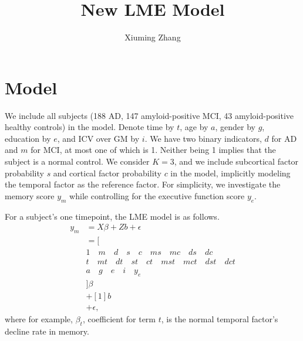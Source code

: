 \documentclass{article}
\title{New LME Model}
\author{Xiuming Zhang}
\begin{document}
\maketitle

\section{Model}

We include all subjects (188 AD, 147 amyloid-positive MCI, 43 amyloid-positive healthy controls) in the model. Denote time by $t$, age by $a$, gender by $g$, education by $e$, and ICV over GM by $i$. We have two binary indicators, $d$ for AD and $m$ for MCI, at most one of which is 1. Neither being 1 implies that the subject is a normal control. We consider $K=3$, and we include subcortical factor probability $s$ and cortical factor probability $c$ in the model, implicitly modeling the temporal factor as the reference factor. For simplicity, we investigate the memory score $y_m$ while controlling for the executive function score $y_e$.

For a subject's one timepoint, the LME model is as follows.
\begin{align}
y_m
&=X\beta+Zb+\epsilon\\
&=[\\
&1\quad m\quad d\quad s\quad c\quad ms\quad mc\quad ds\quad dc\\
&t\quad mt\quad dt\quad st\quad ct\quad mst\quad mct\quad dst\quad dct\\
&a\quad g\quad e\quad i\quad y_e\\
&]\beta\\
&+[1]b\\
&+\epsilon,
\end{align}
where for example, $\beta_t$, coefficient for term $t$, is the normal temporal factor's decline rate in memory.
\end{document}
